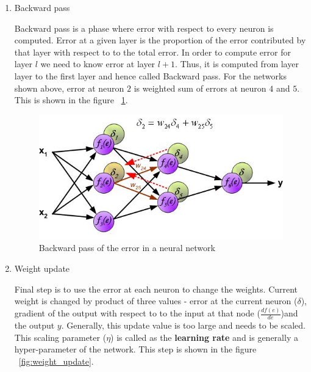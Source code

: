 \begin{enumerate}
	\item Backward pass

Backward pass is a phase where error with respect to every neuron is computed. Error at a given layer is the proportion of the error contributed by that layer with respect to to the total error. In order to compute error for layer $l$ we need to know error at layer $l+1$. 
Thus, it is computed from layer layer to the first layer and hence called Backward pass. For the networks shown above, error at neuron $2$ is weighted sum of errors at neuron $4$ and $5$. This is shown in the figure ~\ref{fig:error2}.

\begin{figure}[H]
	\centering
   \includegraphics[scale=0.86]{figures/intro/error2.bmp}
   \caption[Backward pass]{Backward pass of the error in a neural network}
   \label{fig:error2}
\end{figure}


	\item Weight update

Final step is to use the error at each neuron to change the weights. Current weight is changed by product of three values - error at the current neuron ($\delta$), gradient of the output with respect to to the input at that node ($\frac{df(e)}{de}$)and the output $y$. Generally, this update value is too large and needs to be scaled. This scaling parameter ($\eta$) is called as the \textbf{learning rate} and is generally a hyper-parameter of the network. This step is shown in the figure ~\ref{fig:weight_update}.


\end{enumerate}
